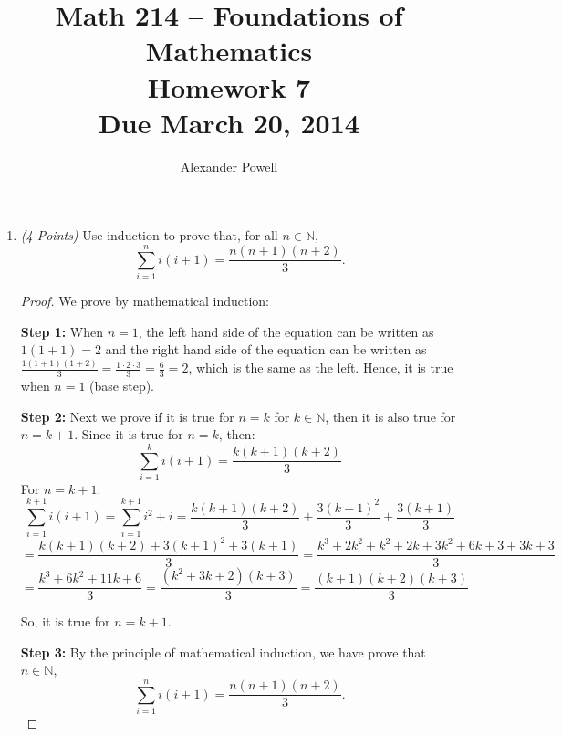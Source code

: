 \documentclass[10pt]{article} %
\title{Math 214 -- Foundations of Mathematics\\
Homework 7\\
{\large{\bf Due March 20, 2014}}}
\date{}
\author{Alexander Powell}
\newcommand{\N}{\mathbb{N}}
\newcommand{\points}[1]{{\it (#1 Points)}}
\begin{document}
\maketitle



\begin{enumerate}





\item   \points{4} Use induction to prove that, for all $n \in \N$, $$\sum_{i=1}^n i(i+1) = \frac{n(n+1)(n+2)}{3}.$$

\bigskip

\begin{proof}

 We prove by mathematical induction:

{\bf Step 1:} When $n=1$, the left hand side of the equation can be written as $1(1+1) = 2$ and the right hand side of the equation can be written as $\frac{1(1+1)(1+2)}{3} = \frac{1 \cdot 2 \cdot 3}{3} = \frac{6}{3} = 2$, which is the same as the left.  Hence, it is true when $n=1$ (base step).  

{\bf Step 2:} Next we prove if it is true for $n=k$ for $k \in \N$, then it is also true for $n=k+1$.  Since it is true for $n=k$, then:
$$\sum_{i=1}^k i(i+1) = \frac{k(k+1)(k+2)}{3}$$
For $n=k+1$:
$$\sum_{i=1}^{k+1} i(i+1) = \sum_{i=1}^{k+1} i^2 + i = \frac{k(k+1)(k+2)}{3} + \frac{3(k+1)^2}{3} + \frac{3(k+1)}{3}$$
$$ = \frac{k(k+1)(k+2)+3(k+1)^2+3(k+1)}{3} = \frac{k^3+2k^2+k^2+2k+3k^2+6k+3+3k+3}{3}$$
$$ = \frac{k^3+6k^2+11k+6}{3} = \frac{(k^2+3k+2)(k+3)}{3} = \frac{(k+1)(k+2)(k+3)}{3}$$

So, it is true for $n=k+1$.  

{\bf Step 3:} By the principle of mathematical induction, we have prove that $n \in \N$, $$\sum_{i=1}^n i(i+1) = \frac{n(n+1)(n+2)}{3}.$$

\end{proof}

\bigskip


\end{enumerate}
\end{document}
